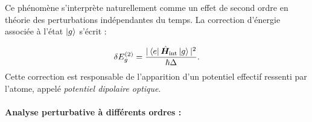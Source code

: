 Ce phénomène s’interprète naturellement comme un effet de second ordre en théorie des perturbations indépendantes du temps. La correction d’énergie associée à l’état \( \ket{g} \) s’écrit :

\begin{equation}
\delta E_g^{(2)} =  \frac{|\bra{e} \hat{\bm{H}}_{\text{int}} \ket{g}|^2}{\hbar \Delta}.
\end{equation}
Cette correction est responsable de l’apparition d’un potentiel effectif ressenti par l’atome, appelé \emph{potentiel dipolaire optique}.


\bigskip

\paragraph{Analyse perturbative à différents ordres :}

